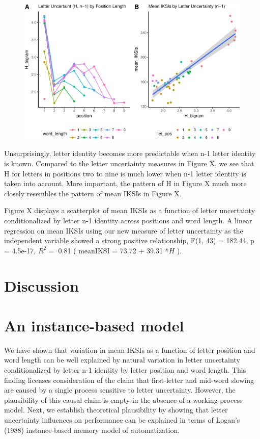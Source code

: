 \documentclass[floatsintext,man]{apa6}
\theoremstyle{definition}
\theoremstyle{definition}
\theoremstyle{definition}
\theoremstyle{remark}
\begin{document}
\begin{figure}[htbp]
\centering
\includegraphics{Entropy_typing_draft_files/figure-latex/letter_uncertainty_bigram-1.pdf}
\caption{}
\end{figure}

Unsurprisingly, letter identity becomes more predictable when n-1 letter
identity is known. Compared to the letter uncertainty measures in Figure
X, we see that H for letters in positions two to nine is much lower when
n-1 letter identity is taken into account. More important, the pattern
of H in Figure X much more closely resembles the pattern of mean IKSIs
in Figure X.

Figure X displays a scatterplot of mean IKSIs as a function of letter
uncertainty conditionalized by letter n-1 identity across positions and
word length. A linear regression on mean IKSIs using our new measure of
letter uncertainty as the independent variable showed a strong positive
relationship, F(1, 43) = 182.44, p = 4.5e-17, \(R^2 =\) 0.81 ( meanIKSI
= 73.72 \(+\) 39.31 \(* H\) ).

\section{Discussion}\label{discussion}

\section{An instance-based model}\label{an-instance-based-model}

We have shown that variation in mean IKSIs as a function of letter
position and word length can be well explained by natural variation in
letter uncertainty conditionalized by letter n-1 identity by letter
position and word length. This finding licenses consideration of the
claim that first-letter and mid-word slowing are caused by a single
process sensitive to letter uncertainty. However, the plausibility of
this causal claim is empty in the absence of a working process model.
Next, we establish theoretical plausibility by showing that letter
uncertainty influences on performance can be explained in terms of
Logan's (1988) instance-based memory model of automatization.
\end{document}
